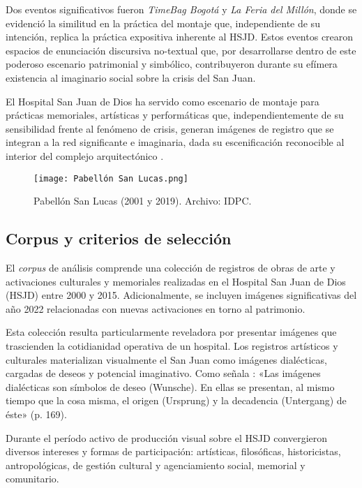 Dos eventos significativos fueron \textit{TimeBag Bogotá} y \textit{La Feria del Millón}, donde se evidenció la similitud en la práctica del montaje que, independiente de su intención, replica la práctica expositiva inherente al HSJD. Estos eventos crearon espacios de enunciación discursiva no-textual que, por desarrollarse dentro de este poderoso escenario patrimonial y simbólico, contribuyeron durante su efímera existencia al imaginario social sobre la crisis del San Juan.

El Hospital San Juan de Dios ha servido como escenario de montaje para prácticas memoriales, artísticas y performáticas que, independientemente de su sensibilidad frente al fenómeno de crisis, generan imágenes de registro que se integran a la red significante e imaginaria, dada su escenificación reconocible al interior del complejo arquitectónico \parencite{BuckMorss1989}.

\begin{figure}[ht]
    \texttt{[image: Pabellón San Lucas.png]}
    \caption{Pabellón San Lucas (2001 y 2019). Archivo: IDPC.}
\end{figure}

\subsection{Corpus y criterios de selección}

El \textit{corpus} de análisis comprende una colección de registros de obras de arte y activaciones culturales y memoriales realizadas en el Hospital San Juan de Dios (HSJD) entre 2000 y 2015. Adicionalmente, se incluyen imágenes significativas del año 2022 relacionadas con nuevas activaciones en torno al patrimonio.

Esta colección resulta particularmente reveladora por presentar imágenes que trascienden la cotidianidad operativa de un hospital. Los registros artísticos y culturales materializan visualmente el San Juan como imágenes dialécticas, cargadas de deseos y potencial imaginativo. Como señala \parencite{DidiHuberman2011}: «Las imágenes dialécticas son símbolos de deseo (Wunsche). En ellas se presentan, al mismo tiempo que la cosa misma, el origen (Ursprung) y la decadencia (Untergang) de éste» (p. 169).

Durante el período activo de producción visual sobre el HSJD convergieron diversos intereses y formas de participación: artísticas, filosóficas, historicistas, antropológicas, de gestión cultural y agenciamiento social, memorial y comunitario.

